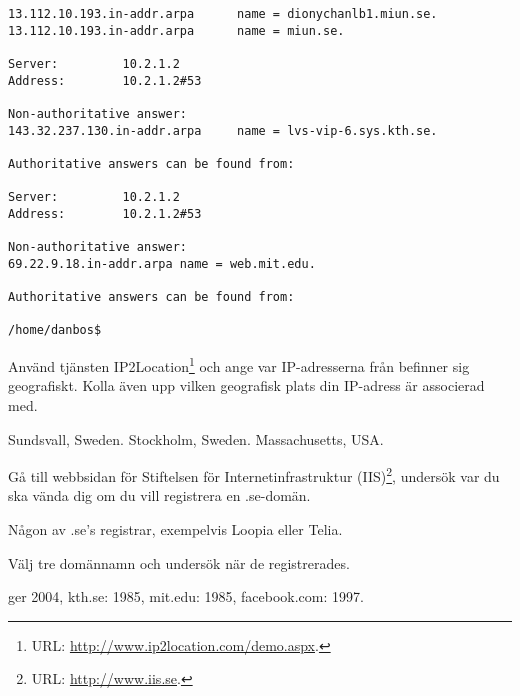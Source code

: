 \documentclass[11pt,a4paper]{miunasgn}
\begin{document}
\begin{questions}
\begin{solution}
\begin{lstlisting}
13.112.10.193.in-addr.arpa      name = dionychanlb1.miun.se.
13.112.10.193.in-addr.arpa      name = miun.se.

Server:         10.2.1.2
Address:        10.2.1.2#53

Non-authoritative answer:
143.32.237.130.in-addr.arpa     name = lvs-vip-6.sys.kth.se.

Authoritative answers can be found from:

Server:         10.2.1.2
Address:        10.2.1.2#53

Non-authoritative answer:
69.22.9.18.in-addr.arpa name = web.mit.edu.

Authoritative answers can be found from:

/home/danbos$ 
	\end{lstlisting}
\end{solution}

\question
Använd tjänsten IP2Location\footnote{%
	URL: \url{http://www.ip2location.com/demo.aspx}.
} och ange var IP-adresserna från  befinner sig
geografiskt.
Kolla även upp vilken geografisk plats din IP-adress är associerad med.
\begin{solution}
	Sundsvall, Sweden. Stockholm, Sweden. Massachusetts, USA.
\end{solution}

\question
Gå till webbsidan för Stiftelsen för Internetinfrastruktur (IIS)\footnote{%
	URL: \url{http://www.iis.se}.
}, undersök var du ska vända dig om du vill registrera en .se-domän.
\begin{solution}
	Någon av .se's registrar, exempelvis Loopia eller Telia.
\end{solution}

\question
Välj tre domännamn och undersök när de registrerades.
\begin{solution}
	 ger 2004,
	kth.se: 1985,
	mit.edu: 1985,
	facebook.com: 1997.
\end{solution}




\end{questions}
\end{document}
